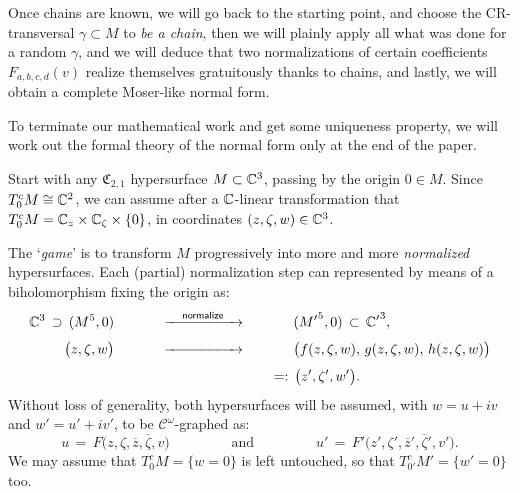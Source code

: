 \documentclass[12pt,twoside,leqno,openany]{amsart}
\begin{document}
Once chains are known, we will go back to the starting point,
and choose the CR-transversal $\gamma \subset M$ to {\em be a chain},
then we will plainly apply all what was done for a random
$\gamma$, and
we will deduce that
two normalizations of certain coefficients
$F_{a,b,c,d}(v)$ 
realize themselves gratuitously thanks to chains,
and lastly, we will obtain a complete 
Moser-like normal form.

To terminate our mathematical work and get some
uniqueness property, we will work out 
the formal theory of the normal form only at the end of the paper.

\label{chain-straightening-harmonic-killing}

Start with any $\mathfrak{C}_{2,1}$ hypersurface $M \subset {\mathbb{C}}^3$,
passing by the origin $0\in M$.  Since $T_{0}^c M \cong \mathbb{C}^2$, we
can assume after a $\mathbb{C}$-linear transformation that $T_{0}^c M =
\mathbb{C}_{z} \times \mathbb{C}_{\zeta} \times \{0\}$, in coordinates $(z, \zeta,
w) \in {\mathbb{C}}^3$.

The `{\sl game}' is to transform $M$ progressively into more and more
{\sl normalized} hypersurfaces. Each (partial) normalization step can
represented by means of a biholomorphism fixing the origin
as:
\[
\aligned
{\C}^3
\,\supset\,
({M}^5,0)
\ \ \ \ \ \ \ \ \ \ 
&
\xrightarrow[{\rule[0pt]{50pt}{0pt}}]{{\sf normalize}}
\ \ \ \ \ \ \ \ \ \ 
({M'}^5,0)
\,\subset\,
{\C'}^3,
\\
\big(z,\zeta,w\big)
\ \ \ \ \ \ \ \ \ \ 
&
\xrightarrow[{\rule[0pt]{50pt}{0pt}}]{}
\ \ \ \ \ \ \ \ \ \
\big(
f(z,\zeta,w),\,
g(z,\zeta,w),\,
h(z,\zeta,w)
\big)
\\
&
\ \ \ \ \ \ \ \ \ \ \ \ \ \ \ \ \ \ \ \ \ \ \ 
\,=:\,
\big(z',\zeta',w'\big).
\endaligned
\]
Without loss of generality, both hypersurfaces will
be assumed, with $w = u + iv$ and $w' = u' +
iv'$, to be $\mathcal{C}^\omega$-graphed as:
\[
u
\,=\,
F\big(z,\zeta,\overline{z},\overline{\zeta},v\big)
\ \ \ \ \ \ \ \ \ \ \ \ \ \ \ \ \ \ \ \
\text{and}
\ \ \ \ \ \ \ \ \ \ \ \ \ \ \ \ \ \ \ \
u'
\,=\,
F'\big(z',\zeta',\overline{z}',\overline{\zeta}',v'\big).
\]
We may assume that $T_{0}^c M = \{ w = 0\}$
is left untouched, so that $T_{0'}^c M' = \{ w' = 0\}$ too.
\end{document}
